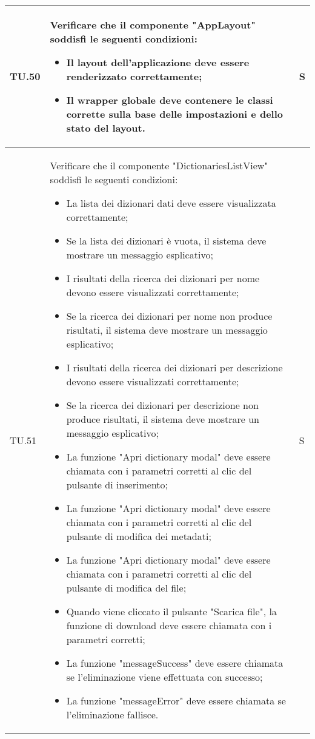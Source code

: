 \begin{adjustwidth}{-0.5cm}{-0.5cm}
\begin{longtable}{|P{1.5cm}|>{\raggedright}P{9.5cm}|>{\arraybackslash}P{1.5cm}|}
		\hline TU.50 & Verificare che il componente "AppLayout" soddisfi le seguenti condizioni:
    \begin{itemize}
      \item Il layout dell'applicazione deve essere renderizzato correttamente;
      \item Il wrapper globale deve contenere le classi corrette sulla base delle impostazioni e dello stato del layout.
    \end{itemize} & S \\

		\hline TU.51 & Verificare che il componente "DictionariesListView" soddisfi le seguenti condizioni:
    \begin{itemize}
      \item La lista dei dizionari dati deve essere visualizzata correttamente;
			\item Se la lista dei dizionari è vuota, il sistema deve mostrare un messaggio esplicativo;
			\item I risultati della ricerca dei dizionari per nome devono essere visualizzati correttamente;
			\item Se la ricerca dei dizionari per nome non produce risultati, il sistema deve mostrare un messaggio esplicativo;
			\item I risultati della ricerca dei dizionari per descrizione devono essere visualizzati correttamente;
			\item Se la ricerca dei dizionari per descrizione non produce risultati, il sistema deve mostrare un messaggio esplicativo;
			\item La funzione "Apri dictionary modal" deve essere chiamata con i parametri corretti al clic del pulsante di inserimento;
			\item La funzione "Apri dictionary modal" deve essere chiamata con i parametri corretti al clic del pulsante di modifica dei metadati;
			\item La funzione "Apri dictionary modal" deve essere chiamata con i parametri corretti al clic del pulsante di modifica del file;
			\item Quando viene cliccato il pulsante "Scarica file", la funzione di download deve essere chiamata con i parametri corretti;
			\item La funzione "messageSuccess" deve essere chiamata se l'eliminazione viene effettuata con successo;
			\item La funzione "messageError" deve essere chiamata se l'eliminazione fallisce.
    \end{itemize} & S \\


\end{longtable}
\end{adjustwidth}
